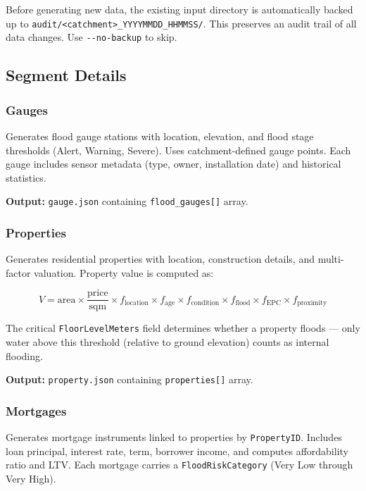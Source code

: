 \documentclass[11pt,a4paper]{article}
\begin{document}
Before generating new data, the existing input directory is automatically
backed up to \texttt{audit/<catchment>\_YYYYMMDD\_HHMMSS/}. This preserves an
audit trail of all data changes. Use \texttt{-{}-no-backup} to skip.

\subsection{Segment Details}

\subsubsection{Gauges}

Generates flood gauge stations with location, elevation, and flood stage
thresholds (Alert, Warning, Severe). Uses catchment-defined gauge points.
Each gauge includes sensor metadata (type, owner, installation date) and
historical statistics.

\textbf{Output:} \texttt{gauge.json} containing \texttt{flood\_gauges[]}
array.

\subsubsection{Properties}

Generates residential properties with location, construction details, and
multi-factor valuation. Property value is computed as:

\begin{equation*}
V = \text{area} \times \frac{\text{price}}{\text{sqm}} \times f_{\text{location}} \times f_{\text{age}} \times f_{\text{condition}} \times f_{\text{flood}} \times f_{\text{EPC}} \times f_{\text{proximity}}
\end{equation*}

The critical \texttt{FloorLevelMeters} field determines whether a property
floods --- only water above this threshold (relative to ground elevation)
counts as internal flooding.

\textbf{Output:} \texttt{property.json} containing \texttt{properties[]}
array.

\subsubsection{Mortgages}

Generates mortgage instruments linked to properties by \texttt{PropertyID}.
Includes loan principal, interest rate, term, borrower income, and computes
affordability ratio and LTV. Each mortgage carries a
\texttt{FloodRiskCategory} (Very Low through Very High).
\end{document}
